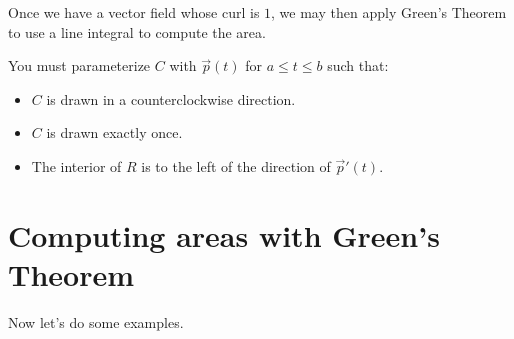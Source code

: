 \documentclass{ximera}
\begin{document}
Once we have a vector field whose curl is $1$, we may then apply
Green's Theorem to use a line integral to compute the area.

\begin{warning}
  You must parameterize $C$ with $\vec{p}(t)$ for $a\le t\le b$ such that:
  \begin{itemize}
    \item $C$ is drawn in a counterclockwise direction.
    \item $C$ is drawn exactly once.
    \item The interior of $R$ is to the left of the direction of
      $\vec{p}'(t)$.
  \end{itemize}
\end{warning}




\section{Computing areas with Green's Theorem}

Now let's do some examples.
\end{document}
